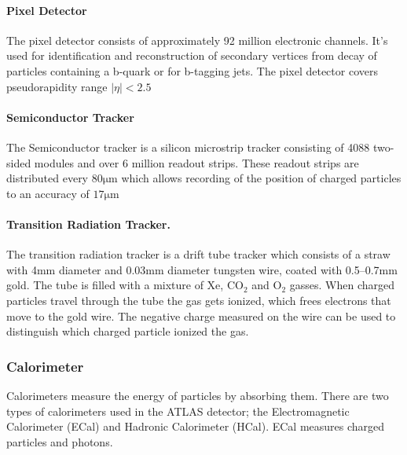 \documentclass[12pt,a4paper]{article}
\numberwithin{equation}{section}
\begin{document}
\paragraph{Pixel Detector}
The pixel detector consists of approximately 92 million electronic channels.
It's used for identification and reconstruction of secondary vertices from decay
of particles containing a b-quark or for b-tagging jets. The pixel detector
covers pseudorapidity range $|\eta| < 2.5 $

\paragraph{Semiconductor Tracker}
The Semiconductor tracker is a silicon microstrip tracker consisting of 4088
two-sided modules and over 6 million readout strips. These readout strips are
distributed every $80\mathrm{\mu m}$ which allows recording of the position of
charged particles to an accuracy of $17\mathrm{\mu m}$

\paragraph{Transition Radiation Tracker.}
The transition radiation tracker is a drift tube tracker which consists of a
straw with 4mm diameter and 0.03mm diameter tungsten wire, coated with 0.5--0.7mm
gold. The tube is filled with a mixture of Xe, $\mathrm{CO_2}$ and
$\mathrm{O_2}$ gasses. When charged particles travel through the tube the gas gets
ionized, which frees electrons that move to the gold wire. The negative charge %
measured on the wire can be used to distinguish which charged particle ionized
the gas.

\subsubsection{Calorimeter}
Calorimeters measure the energy of particles by absorbing them. There are two
types of calorimeters used in the ATLAS detector; the Electromagnetic
Calorimeter (ECal) and Hadronic Calorimeter (HCal). ECal measures charged
particles and photons.
\end{document}
